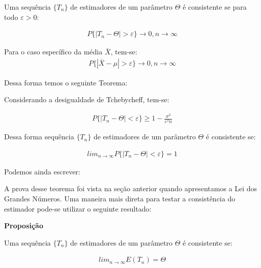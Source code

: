 \documentclass[
  letterpaper,
  DIV=11,
  numbers=noendperiod]{scrartcl}
\begin{document}
\begin{definicao}

Uma sequência \(\{T_n \}\) de estimadores de um parâmetro \(\Theta\) é
consistente se para todo \(\varepsilon >0\):

\[\begin{array}{ccc}
P\{ | T_n - \Theta | > \varepsilon \} \rightarrow 0 , n \rightarrow \infty
\end{array}\]

Para o caso específico da média \(\bar{X}\), tem-se:
\[\begin{array}{ccc}
P\{ | \bar{X} - \mu | > \varepsilon \} \rightarrow 0 , n \rightarrow \infty
\end{array}\]

\end{definicao}

\hfill\break

Dessa forma temos o seguinte Teorema:

\begin{teorema}

Considerando a desigualdade de Tchebycheff, tem-se:

\[\begin{array}{ccc}
P\{ | T_n - \Theta | < \varepsilon \} \geq 1-\frac{\sigma^2}{\varepsilon^2n}
\end{array}\]

Dessa forma sequência \(\{T_n \}\) de estimadores de um parâmetro
\(\Theta\) é consistente se:

\[\begin{array}{ccc}
lim_{n \rightarrow \infty} P\{ | T_n - \Theta | < \varepsilon \} = 1
\end{array}\]

Podemos ainda escrever:



\end{teorema}

A prova desse teorema foi vista na seção anterior quando apresentamos a
Lei dos Grandes Números. Uma maneira mais direta para testar a
consistência do estimador pode-se utilizar o seguinte resultado:

\textbf{Proposição}

Uma sequência \(\{T_n \}\) de estimadores de um parâmetro \(\Theta\) é
consistente se:

\[\begin{array}{ccc}
lim_{n \rightarrow \infty} E(T_n) = \Theta
\end{array}\]
\end{document}

